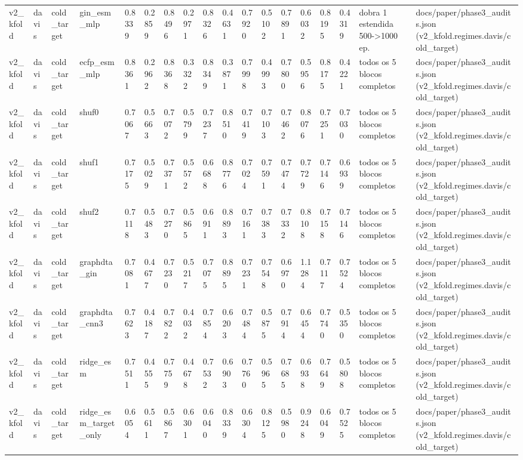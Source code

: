 \begin{table}[htbp]
\begin{tabular}{llllllllllllllllll}
v2\_kfold & davis & cold\_target & gin\_esm\_mlp & 0.8339 & 0.2859 & 0.8496 & 0.2971 & 0.8326 & 0.4631 & 0.7920 & 0.5102 & 0.7891 & 0.6032 & 0.8195 & 0.4319 & dobra 1 estendida 500->1000 ep. & docs/paper/phase3\_audits.json (v2\_kfold.regimes.davis/cold\_target) \\
v2\_kfold & davis & cold\_target & ecfp\_esm\_mlp & 0.8361 & 0.2962 & 0.8368 & 0.3322 & 0.8349 & 0.3871 & 0.7998 & 0.4993 & 0.7800 & 0.5956 & 0.8175 & 0.4221 & todos os 5 blocos completos & docs/paper/phase3\_audits.json (v2\_kfold.regimes.davis/cold\_target) \\
v2\_kfold & davis & cold\_target & shuf0 & 0.7067 & 0.5663 & 0.7072 & 0.5799 & 0.7237 & 0.8510 & 0.7419 & 0.7103 & 0.7462 & 0.8076 & 0.7251 & 0.7030 & todos os 5 blocos completos & docs/paper/phase3\_audits.json (v2\_kfold.regimes.davis/cold\_target) \\
v2\_kfold & davis & cold\_target & shuf1 & 0.7175 & 0.5029 & 0.7371 & 0.5572 & 0.6688 & 0.8776 & 0.7024 & 0.7591 & 0.7474 & 0.7729 & 0.7146 & 0.6939 & todos os 5 blocos completos & docs/paper/phase3\_audits.json (v2\_kfold.regimes.davis/cold\_target) \\
v2\_kfold & davis & cold\_target & shuf2 & 0.7118 & 0.5483 & 0.7270 & 0.5865 & 0.6911 & 0.8893 & 0.7161 & 0.7383 & 0.7332 & 0.8108 & 0.7158 & 0.7146 & todos os 5 blocos completos & docs/paper/phase3\_audits.json (v2\_kfold.regimes.davis/cold\_target) \\
v2\_kfold & davis & cold\_target & graphdta\_gin & 0.7081 & 0.4677 & 0.7230 & 0.5217 & 0.7075 & 0.8895 & 0.7231 & 0.7548 & 0.6970 & 1.1284 & 0.7117 & 0.7524 & todos os 5 blocos completos & docs/paper/phase3\_audits.json (v2\_kfold.regimes.davis/cold\_target) \\
v2\_kfold & davis & cold\_target & graphdta\_cnn3 & 0.7623 & 0.4187 & 0.7822 & 0.4032 & 0.7854 & 0.6203 & 0.7484 & 0.5875 & 0.7914 & 0.6454 & 0.7740 & 0.5350 & todos os 5 blocos completos & docs/paper/phase3\_audits.json (v2\_kfold.regimes.davis/cold\_target) \\
v2\_kfold & davis & cold\_target & ridge\_esm & 0.7511 & 0.4555 & 0.7759 & 0.4678 & 0.7532 & 0.6903 & 0.7760 & 0.5965 & 0.7685 & 0.6938 & 0.7649 & 0.5808 & todos os 5 blocos completos & docs/paper/phase3\_audits.json (v2\_kfold.regimes.davis/cold\_target) \\
v2\_kfold & davis & cold\_target & ridge\_esm\_target\_only & 0.6054 & 0.5611 & 0.5867 & 0.6301 & 0.6040 & 0.8339 & 0.6304 & 0.8125 & 0.5980 & 0.9248 & 0.6049 & 0.7525 & todos os 5 blocos completos & docs/paper/phase3\_audits.json (v2\_kfold.regimes.davis/cold\_target) \\

\end{tabular}
\end{table}
